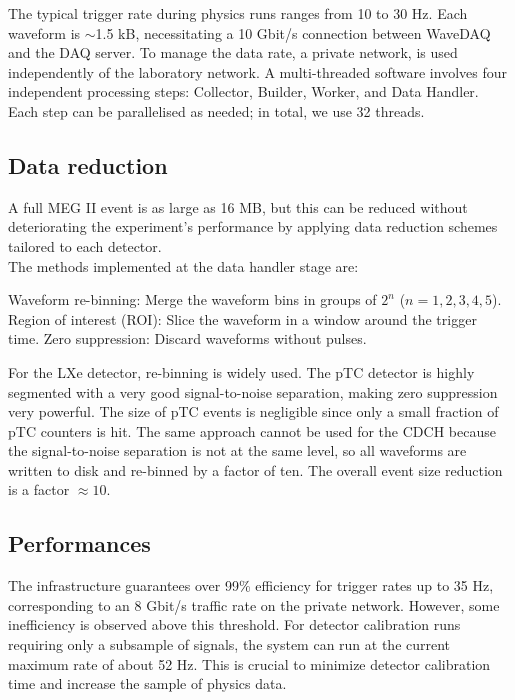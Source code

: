 \begin{refsection}
    The typical trigger rate during physics runs ranges from 10 to 30 Hz. 
    Each waveform is $\sim$1.5 kB, necessitating a 10 Gbit/s connection between WaveDAQ and the DAQ server. 
    To manage the data rate, a private network, is used independently of the laboratory network. 
    A multi-threaded software involves four independent processing steps: Collector, Builder, Worker, and Data Handler. 
    Each step can be parallelised as needed; in total, we use 32 threads.

    \subsection{Data reduction}
        A full MEG II event is as large as 16 MB, but this can be reduced without deteriorating the experiment’s performance by applying data reduction schemes tailored to each detector.\\
        \noindent
        The methods implemented at the data handler stage are:
        \begin{outline}
            \1 Waveform re-binning: Merge the waveform bins in groups of \(2^n\) (\(n = 1, 2, 3, 4, 5\)).
            \1 Region of interest (ROI): Slice the waveform in a window around the trigger time.
            \1 Zero suppression: Discard waveforms without pulses.
        \end{outline}
        \noindent
        For the LXe detector, re-binning is widely used.
        The pTC detector is highly segmented with a very good signal-to-noise separation, making zero suppression very powerful. 
        The size of pTC events is negligible since only a small fraction of pTC counters is hit.
        The same approach cannot be used for the CDCH because the signal-to-noise separation is not at the same level, so all waveforms are written to disk and re-binned by a factor of ten. 
        The overall event size reduction is a factor $\approx 10$.

    \subsection{Performances}
        The infrastructure guarantees over 99\% efficiency for trigger rates up to 35 Hz, corresponding to an 8 Gbit/s traffic rate on the private network. 
        However, some inefficiency is observed above this threshold.
        For detector calibration runs requiring only a subsample of signals, the system can run at the current maximum rate of about 52 Hz. 
        This is crucial to minimize detector calibration time and increase the sample of physics data.
        

\end{refsection}
